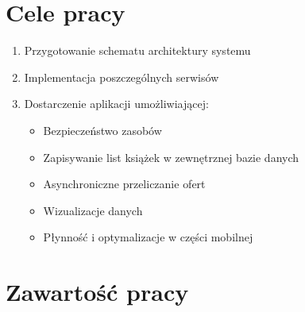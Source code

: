 
\section{Cele pracy}
\label{sec:celePracy}
\begin{enumerate}
    \item Przygotowanie schematu architektury systemu
    \item Implementacja poszczególnych serwisów
    \item Dostarczenie aplikacji umożliwiającej: 
    \begin{itemize}
        \item Bezpieczeństwo zasobów
        \item Zapisywanie list książek w zewnętrznej bazie danych 
        \item Asynchroniczne przeliczanie ofert
        \item Wizualizacje danych
        \item Płynność i optymalizacje w części mobilnej
    \end{itemize}
\end{enumerate}


\section{Zawartość pracy}
\label{sec:zawartoscPracy}

